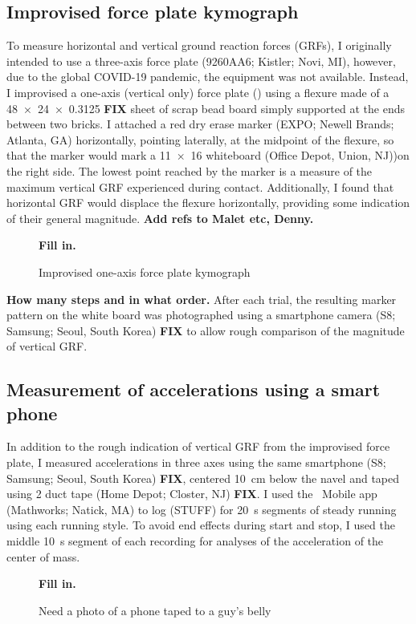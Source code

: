 \subsection{Improvised force plate kymograph}
To measure horizontal and vertical ground reaction forces (GRFs), I originally intended to use a three-axis force plate (9260AA6; Kistler; Novi, MI), however, due to the global COVID-19 pandemic, the equipment was not available. Instead, I improvised a one-axis (vertical only) force plate () using a flexure made of a \SI{48 x 24 x 0.3125}{\inch} \textbf{FIX} sheet of scrap bead board simply supported at the ends between two bricks. I attached a red dry erase marker (EXPO; Newell Brands; Atlanta, GA) horizontally, pointing laterally, at the midpoint of the flexure, so that the marker would mark a \SI{11x16}{\inch} whiteboard (Office Depot, Union, NJ))on the right side. The lowest point reached by the marker is a measure of the maximum vertical GRF experienced during contact. Additionally, I found that horizontal GRF would displace the flexure horizontally, providing some indication of their general magnitude. \textbf{Add refs to Malet etc, Denny.}
\begin{figure}
\begin{center}
    \textbf{Fill in.}
\end{center}
\caption{Improvised one-axis force plate kymograph}
\label{fig:methods:forceplate}
\end{figure}

\textbf{How many steps and in what order.} After each trial, the resulting marker pattern on the white board was photographed using a smartphone camera (S8; Samsung; Seoul, South Korea) \textbf{FIX} to allow rough comparison of the magnitude of vertical GRF. 



\subsection{Measurement of accelerations using a smart phone}
In addition to the rough indication of vertical GRF from the improvised force plate, I measured accelerations in three axes using the same smartphone (S8; Samsung; Seoul, South Korea) \textbf{FIX}, centered \SI{10}{\centi\meter} below the navel and taped using \SI{2}{\inch} duct tape (Home Depot; Closter, NJ) \textbf{FIX}. I used the \Matlab\ Mobile app (Mathworks; Natick, MA) to log (STUFF) for \SI{20}{\second} segments of steady running using each running style. To avoid end effects during start and stop, I used the middle \SI{10}{\second} segment of each recording for analyses of the acceleration of the center of mass. 
\begin{figure}
\begin{center}
    \textbf{Fill in.}
\end{center}
\caption{Need a photo of a phone taped to a guy's belly}
\label{fig:methods:accel}
\end{figure}



